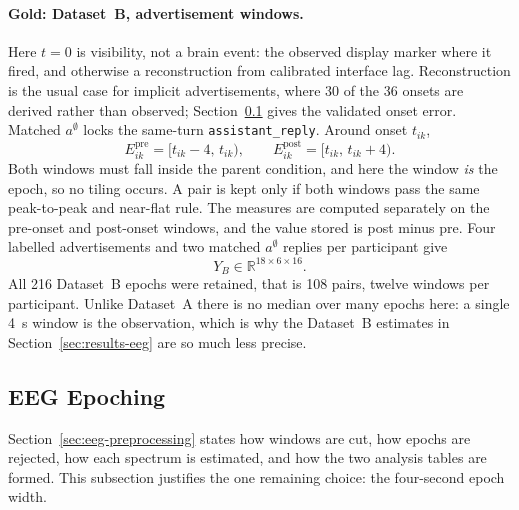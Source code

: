 \documentclass[english]{article}
\begin{document}
\paragraph{Gold: Dataset~B, advertisement windows.}
Here \(t=0\) is visibility, not a brain event: the observed display marker where it fired, and otherwise a reconstruction from calibrated interface lag. Reconstruction is the usual case for implicit advertisements, where 30 of the 36 onsets are derived rather than observed; Section~\ref{sec:eeg-epoching} gives the validated onset error. Matched \(a^{\emptyset}\) locks the same-turn \texttt{assistant\_reply}. Around onset \(t_{ik}\),
\begin{equation}
E^{\mathrm{pre}}_{ik}=[t_{ik}-4,\,t_{ik}),
\qquad
E^{\mathrm{post}}_{ik}=[t_{ik},\,t_{ik}+4).
\end{equation}
Both windows must fall inside the parent condition, and here the window \emph{is} the epoch, so no tiling occurs. A pair is kept only if both windows pass the same peak-to-peak and near-flat rule. The measures are computed separately on the pre-onset and post-onset windows, and the value stored is post minus pre. Four labelled advertisements and two matched \(a^{\emptyset}\) replies per participant give
\begin{equation}
Y_B\in\mathbb{R}^{18\times 6\times 16}.
\end{equation}
All 216 Dataset~B epochs were retained, that is 108 pairs, twelve windows per participant. Unlike Dataset~A there is no median over many epochs here: a single 4~s window is the observation, which is why the Dataset~B estimates in Section~\ref{sec:results-eeg} are so much less precise.

\subsection{EEG Epoching}
\label{sec:eeg-epoching}

Section~\ref{sec:eeg-preprocessing} states how windows are cut, how epochs are rejected, how each spectrum is estimated, and how the two analysis tables are formed. This subsection justifies the one remaining choice: the four-second epoch width.
\end{document}
